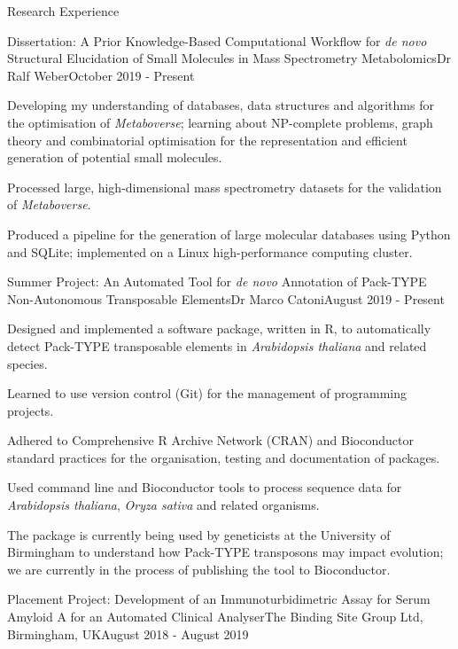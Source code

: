 \documentclass{resume}
\begin{document}
\begin{rSection}{Research Experience}

\begin{rSubsection}{Dissertation: A Prior Knowledge-Based Computational Workflow for \textit{de novo} Structural Elucidation of Small Molecules in Mass Spectrometry Metabolomics}{}{Dr Ralf Weber}{October 2019 - Present}

\item Developing my understanding of databases, data structures and algorithms for the optimisation of \textit{Metaboverse}; learning about NP-complete problems, graph theory and combinatorial optimisation for the representation and efficient generation of potential small molecules. 
\item Processed large, high-dimensional mass spectrometry datasets for the validation of \textit{Metaboverse}. 
\item Produced a pipeline for the generation of large molecular databases using Python and SQLite; implemented on a Linux high-performance computing cluster.
\end{rSubsection}

\begin{rSubsection}{Summer Project: An Automated Tool for \textit{de novo} Annotation of Pack-TYPE Non-Autonomous Transposable Elements}{}{Dr Marco Catoni}{August 2019 - Present}

\item Designed and implemented a software package, written in R, to automatically detect Pack-TYPE transposable elements in \textit{Arabidopsis thaliana} and related species. 
\item Learned to use version control (Git) for the management of programming projects.
\item Adhered to Comprehensive R Archive Network (CRAN) and Bioconductor standard practices for the organisation, testing and documentation of packages.
\item Used command line and Bioconductor tools to process sequence data for \textit{Arabidopsis thaliana}, \textit{Oryza sativa} and related organisms.
\item The package is currently being used by geneticists at the University of Birmingham to understand how Pack-TYPE transposons may impact evolution; we are currently in the process of publishing the tool to Bioconductor.
\end{rSubsection}

\newpage
\begin{rSubsection}{Placement Project: Development of an Immunoturbidimetric Assay for Serum Amyloid A for an Automated Clinical Analyser}{}{The Binding Site Group Ltd, Birmingham, UK}{August 2018 - August 2019}


\end{rSubsection}
\end{rSection}
\end{document}
